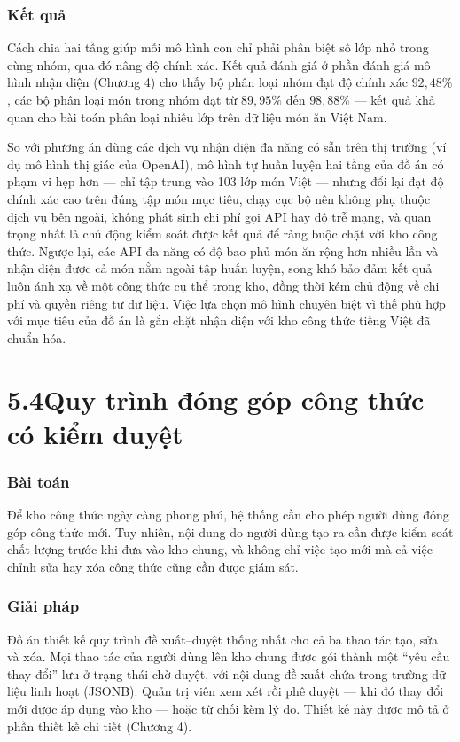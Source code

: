 \documentclass[13pt,a4paper]{article}
\begin{document}
\subsubsection*{Kết quả}
Cách chia hai tầng giúp mỗi mô hình con chỉ phải phân biệt số lớp nhỏ trong cùng nhóm, qua đó nâng độ chính xác. Kết quả đánh giá ở phần đánh giá mô hình nhận diện (Chương 4) cho thấy bộ phân loại nhóm đạt độ chính xác $92{,}48\%$, các bộ phân loại món trong nhóm đạt từ $89{,}95\%$ đến $98{,}88\%$ --- kết quả khả quan cho bài toán phân loại nhiều lớp trên dữ liệu món ăn Việt Nam.

So với phương án dùng các dịch vụ nhận diện đa năng có sẵn trên thị trường (ví dụ mô hình thị giác của OpenAI), mô hình tự huấn luyện hai tầng của đồ án có phạm vi hẹp hơn --- chỉ tập trung vào 103 lớp món Việt --- nhưng đổi lại đạt độ chính xác cao trên đúng tập món mục tiêu, chạy cục bộ nên không phụ thuộc dịch vụ bên ngoài, không phát sinh chi phí gọi API hay độ trễ mạng, và quan trọng nhất là chủ động kiểm soát được kết quả để ràng buộc chặt với kho công thức. Ngược lại, các API đa năng có độ bao phủ món ăn rộng hơn nhiều lần và nhận diện được cả món nằm ngoài tập huấn luyện, song khó bảo đảm kết quả luôn ánh xạ về một công thức cụ thể trong kho, đồng thời kém chủ động về chi phí và quyền riêng tư dữ liệu. Việc lựa chọn mô hình chuyên biệt vì thế phù hợp với mục tiêu của đồ án là gắn chặt nhận diện với kho công thức tiếng Việt đã chuẩn hóa.

\section*{5.4\quad Quy trình đóng góp công thức có kiểm duyệt}
\subsubsection*{Bài toán}
Để kho công thức ngày càng phong phú, hệ thống cần cho phép người dùng đóng góp công thức mới. Tuy nhiên, nội dung do người dùng tạo ra cần được kiểm soát chất lượng trước khi đưa vào kho chung, và không chỉ việc tạo mới mà cả việc chỉnh sửa hay xóa công thức cũng cần được giám sát.

\subsubsection*{Giải pháp}
Đồ án thiết kế quy trình đề xuất--duyệt thống nhất cho cả ba thao tác tạo, sửa và xóa. Mọi thao tác của người dùng lên kho chung được gói thành một ``yêu cầu thay đổi'' lưu ở trạng thái chờ duyệt, với nội dung đề xuất chứa trong trường dữ liệu linh hoạt (JSONB). Quản trị viên xem xét rồi phê duyệt --- khi đó thay đổi mới được áp dụng vào kho --- hoặc từ chối kèm lý do. Thiết kế này được mô tả ở phần thiết kế chi tiết (Chương 4).
\end{document}
